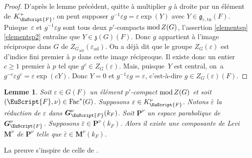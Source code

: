\documentclass[JEP,XML,SOM,Unicode,francais]{cedram}
\let\mathcal \EuScript
\let\epsilon\varepsilon
\newcommand{\rmod}{\textup{mod}\,}
\newcommand{\frg}{\mathfrak{g}}
\newcommand{\frz}{\mathfrak{z}}
\newcommand{\AD}{\mathrm{AD}}
\newcommand{\Fac}{\mathrm{Fac}}
\newcommand{\tn}{\mathrm{tn}}
\DeclareMathOperator{\ad}{ad}
\newcommand{\bG}{\boldsymbol{G}}
\newcommand{\bM}{\boldsymbol{M}}
\newcommand{\bP}{\boldsymbol{P}}
\newcommand{\cF}{\mathcal{F}}
\theoremstyle{plain}
\newtheorem*{lem*}{Lemme}
\theoremstyle{definition}
\begin{document}
\begin{proof}
D'après le lemme précédent, quitte à multiplier $g$ à droite par un élément de $K_{\cF}^+$, on peut supposer $g^{-1}\epsilon g=\epsilon \exp(Y)$ avec $Y\in \frg_{\epsilon,\tn}(F)$. Puisque~$\epsilon$ et $g^{-1}\epsilon g$ sont tous deux $p'$-compacts $\rmod Z(G)$, l'assertion \ref{elementsp}\,\eqref{elementsp2} entraîne que \hbox{$Y\in \frz(G)(F)$}. Donc $g$ appartient à l'image réciproque dans $G$ de $Z_{G_{\AD}}(\epsilon_{\ad})$. On a déjà dit que le groupe $Z_{G}(\epsilon)$ est d'indice fini premier à $p$ dans cette image réciproque. Il existe donc un entier $c\geq1$ premier à $p$ tel que $g^c\in Z_{G}(\epsilon)$. Mais, puisque~$Y$ est central, on~a $g^{-c}\epsilon g^c=\epsilon \exp(cY)$. Donc $Y=0$ et $g^{-1}\epsilon g=\epsilon$, c'est-à-dire $g\in Z_{G}(\epsilon)(F)$.
\end{proof}

\label{p'unlemme}
\begin{lem*}
Soit $\epsilon\in G(F)$ un élément $p'$-compact $\rmod Z(G)$ et soit $(\cF,\nu)\in \Fac^*(G)$. Supposons $\epsilon\in K_{\cF}^{\nu}$. Notons $\bar{\epsilon}$ la réduction de $\epsilon$ dans $\bG_{\cF}^{\nu}(k_{F})$. Soit $\bP^{\nu}$ un espace parabolique de $\bG_{\cF}^{\nu}$. Supposons $\bar{\epsilon}\in \bP^{\nu}(k_{F})$. Alors il existe une composante de Levi~$\bM^{\nu}$ de $\bP^{\nu}$ telle que $\bar{\epsilon}\in \bM^{\nu}(k_{F})$.
\end{lem*}

La preuve s'inspire de celle de \cite[Lem.\,9]{P}.
\end{document}
